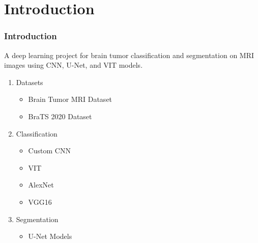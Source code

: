 \documentclass[../presentation.tex]{subfiles} %
\begin{document}
\section{Introduction} %

\begin{frame}

	\frametitle{Introduction}

	\begin{center}
  A deep learning project for brain tumor classification and segmentation on MRI images using CNN, U-Net, and VIT models.
	\end{center}

	\begin{enumerate}
		\item Datasets
			\begin{itemize}
				\item Brain Tumor MRI Dataset 
				\item BraTS 2020 Dataset 
			\end{itemize}
		\item Classification
			\begin{itemize}
				\item Custom CNN
				\item VIT
				\item AlexNet
				\item VGG16
			\end{itemize}
		\item Segmentation
			\begin{itemize}
				\item U-Net Models
			\end{itemize}
	\end{enumerate}

\end{frame}
\end{document}
